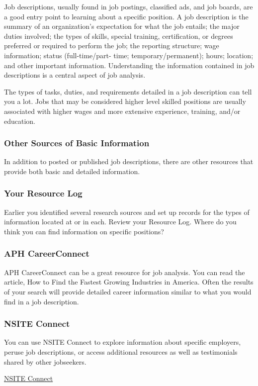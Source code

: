 Job descriptions, usually found in job postings, classified ads, and job boards, are a good entry point to learning about a specific position. A job description is the summary of an organization's expectation for what the job entails; the major duties involved; the types of skills, special training, certification, or degrees preferred or required to perform the job; the reporting structure; wage information; status (full-time/part- time; temporary/permanent); hours; location; and other important information. Understanding the information contained in job descriptions is a central aspect of job analysis.

The types of tasks, duties, and requirements detailed in a job description can tell you a lot. Jobs that may be considered higher level skilled positions are usually associated with higher wages and more extensive experience, training, and/or education.
\subsubsection*{Other Sources of Basic Information}
In addition to posted or published job descriptions, there are other resources that provide both basic and detailed information.
\subsubsection*{Your Resource Log}
Earlier you identified several research sources and set up records for the types of information located at or in each. Review your Resource Log. Where do you think you can find information on specific positions?
\subsubsection*{APH CareerConnect}
APH CareerConnect can be a great resource for job analysis. You can read the article, How to Find the Fastest Growing Industries in America. Often the results of your search will provide detailed career information similar to what you would find in a job description.
\subsubsection*{NSITE Connect}
You can use NSITE Connect to explore information about specific employers, peruse job descriptions, or access additional resources as well as testimonials shared by other jobseekers. 

\href{https://nsite.org/job-board/}{NSITE Connect}

